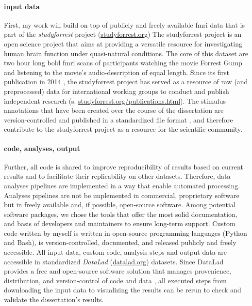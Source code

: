 \paragraph{input data}

First, my work will build on top of publicly and freely available \ac{fmri} data that
is part of the \textit{studyforrest} project
(\href{www.studyforrest.org}{studyforrest.org})
%
The studyforrest project is an open science project that aims at providing a
versatile resource for investigating human brain function under quasi-natural
conditions.
%
The core of this dataset are two hour long \ac{bold} \ac{fmri} scans of
participants watching the movie Forrest Gump and listening to the movie's
audio-description of equal length.
%
Since its first publication in 2014 \citep{hanke2014audiomovie}, the
studyforrest project has served as a resource of raw (and preprocessed) data for
international working groups to conduct and publish independent research (s.
\href{www.studyforrest.org/publications.html}{studyforrest.org/publications.html}).
%
The stimulus annotations that have been created over the course of the
dissertation are version-controlled and published in a standardized file format
\citep{haeusler2021speechanno}, and therefore contribute to the studyforrest
project as a resource for the scientific community.


\paragraph{code, analyses, output}

Further, all code is shared to improve reproducibility of results based on
current results and to facilitate their replicability on other datasets.
Therefore, data analyses pipelines are implemented in a way that enable
automated processing.
%
Analyses pipelines are not be implemented in commercial, proprietary software
but in freely available and, if possible, open-source software.
Among potential software packages, we chose the tools that offer the most solid
documentation, and basis of developers and maintainers to ensure long-term
support.
Custom code written by myself is written in open-source programming languages
(Python and Bash), is version-controlled, documented, and released publicly and
freely accessible.
%
All input data, custom code, analysis steps and output data are accessible in
standardized \textit{DataLad} (\href{www.datalad.org}{datalad.org}) datasets.
Since DataLad provides a free and open-source software solution that manages
provenience, distribution, and version-control of code and data
\citep{halchenko2021datalad}, all executed steps from downloading the input data
to visualizing the results can be rerun to check and validate the dissertation's
results.


